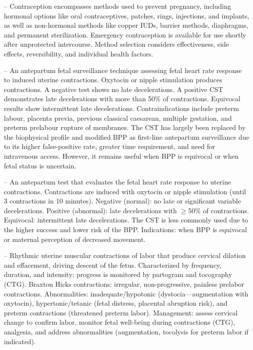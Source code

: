 -- Contraception encompasses methods used to prevent pregnancy, including hormonal options like oral contraceptives, patches, rings, injections, and implants, as well as non-hormonal methods like copper IUDs, barrier methods, diaphragms, and permanent sterilization. Emergency contraception is available for use shortly after unprotected intercourse. Method selection considers effectiveness, side effects, reversibility, and individual health factors.

-- An antepartum fetal surveillance technique assessing fetal heart rate response to induced uterine contractions. Oxytocin or nipple stimulation produces contractions. A negative test shows no late decelerations. A positive CST demonstrates late decelerations with more than 50\% of contractions. Equivocal results show intermittent late decelerations. Contraindications include preterm labour, placenta previa, previous classical caesarean, multiple gestation, and preterm prelabour rupture of membranes. The CST has largely been replaced by the biophysical profile and modified BPP as first-line antepartum surveillance due to its higher false-positive rate, greater time requirement, and need for intravenous access. However, it remains useful when BPP is equivocal or when fetal status is uncertain.

-- An antepartum test that evaluates the fetal heart rate response to uterine contractions. Contractions are induced with oxytocin or nipple stimulation (until 3 contractions in 10 minutes). Negative (normal): no late or significant variable decelerations. Positive (abnormal): late decelerations with \(\ge\)50\% of contractions. Equivocal: intermittent late decelerations. The CST is less commonly used due to the higher success and lower risk of the BPP. Indications: when BPP is equivocal or maternal perception of decreased movement.

-- Rhythmic uterine muscular contractions of labor that produce cervical dilation and effacement, driving descent of the fetus. Characterized by frequency, duration, and intensity; progress is monitored by partogram and tocography (CTG). Braxton Hicks contractions: irregular, non-progressive, painless prelabor contractions. Abnormalities: inadequate/hypotonic (dystocia—augmentation with oxytocin), hypertonic/tetanic (fetal distress, placental abruption risk), and preterm contractions (threatened preterm labor). Management: assess cervical change to confirm labor, monitor fetal well-being during contractions (CTG), analgesia, and address abnormalities (augmentation, tocolysis for preterm labor if indicated).

